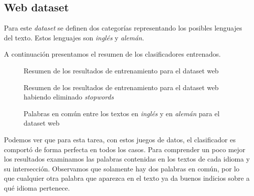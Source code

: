 \documentclass[a4paper,10pt]{article}
\begin{document}
\subsection{\textsf{Web} dataset}

Para este \emph{dataset} se definen dos categorías representando los posibles lenguajes del texto. Estos lenguajes son \emph{inglés} y \emph{alemán}.

A continuación presentamos el resumen de los clasificadores entrenados.

%    
%    

\begin{multicols}{2}
\begin{figure}[H]
    \centering
    \begin{minipage}{0.35\textwidth}
    
    \end{minipage}
    \caption{Resumen de los resultados de entrenamiento para el dataset \textsf{web}}
\end{figure}
\begin{figure}[H]
    \centering
    \begin{minipage}{0.35\textwidth}
    
    \end{minipage}
    \caption{Resumen de los resultados de entrenamiento para el dataset \textsf{web} habiendo eliminado \emph{stopwords}}
\end{figure}
\end{multicols}


\begin{minipage}[c]{\textwidth}

\begin{wrapfigure}{l}{0.3\textwidth}
\centering

\caption{Palabras en común entre los textos en \emph{inglés} y en \emph{alemán} para el dataset \textsf{web}}
\end{wrapfigure}
   
Podemos ver que para esta tarea, con estos juegos de datos, el clasificador es comportó de forma perfecta en todos los casos. Para comprender un poco mejor los resultados examinamos las palabras contenidas en los textos de cada idioma y su intersección. Observamos que solamente hay dos palabras en común, por lo que cualquier otra palabra que aparezca en el texto ya da buenos indicios sobre a qué idioma pertenece.
\end{minipage}
\end{document}
